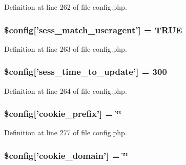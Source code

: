 Definition at line 262 of file config.\-php.

\hypertarget{application_2config_2config_8php_a90a66e41bce1a62ff818c4f0e3aa09d2}{
\subsubsection[{\$config}]{\setlength{\rightskip}{0pt plus 5cm}\$config\mbox{[}'sess\-\_\-match\-\_\-useragent'\mbox{]} = T\-R\-U\-E}}\label{application_2config_2config_8php_a90a66e41bce1a62ff818c4f0e3aa09d2}


Definition at line 263 of file config.\-php.

\hypertarget{application_2config_2config_8php_afb6a66c470a9c08b90efcbc6c5594573}{
\subsubsection[{\$config}]{\setlength{\rightskip}{0pt plus 5cm}\$config\mbox{[}'sess\-\_\-time\-\_\-to\-\_\-update'\mbox{]} = 300}}\label{application_2config_2config_8php_afb6a66c470a9c08b90efcbc6c5594573}


Definition at line 264 of file config.\-php.

\hypertarget{application_2config_2config_8php_ae5f35eb62ffdcfa1878ed13fa47b2d5d}{
\subsubsection[{\$config}]{\setlength{\rightskip}{0pt plus 5cm}\$config\mbox{[}'cookie\-\_\-prefix'\mbox{]} = \char`\"{}\char`\"{}}}\label{application_2config_2config_8php_ae5f35eb62ffdcfa1878ed13fa47b2d5d}


Definition at line 277 of file config.\-php.

\hypertarget{application_2config_2config_8php_a4f967865afe18263372e9c66223a752e}{
\subsubsection[{\$config}]{\setlength{\rightskip}{0pt plus 5cm}\$config\mbox{[}'cookie\-\_\-domain'\mbox{]} = \char`\"{}\char`\"{}}}\label{application_2config_2config_8php_a4f967865afe18263372e9c66223a752e}


